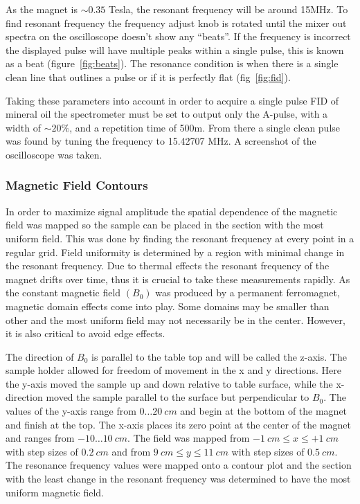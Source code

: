 \documentclass[
reprint,
amsmath,amssymb,
aps,
tikz,
border=5pt
]{revtex4-1}
\begin{document}
    As the magnet is $\sim 0.35$ Tesla, the resonant frequency will be around 15MHz. To find resonant frequency the frequency adjust knob is rotated until the mixer out spectra on the oscilloscope doesn't show any ``beats''. If the frequency is incorrect the displayed pulse will have multiple peaks within a single pulse, this is known as a beat (figure~\ref{fig:beats}). The resonance condition is when there is a single clean line that outlines a pulse or if it is perfectly flat (fig~\ref{fig:fid}). 

    Taking these parameters into account in order to acquire a single pulse FID of mineral oil the spectrometer must be set to output only the A-pulse, with a width of $\sim 20\%$, and a repetition time of 500m. From there a single clean pulse was found by tuning the frequency to 15.42707 MHz. A screenshot of the oscilloscope was taken. 

\subsubsection*{Magnetic Field Contours}

    In order to maximize signal amplitude the spatial dependence of the magnetic field was mapped so the sample can be placed in the section with the most uniform field. This was done by finding the resonant frequency at every point in a regular grid. Field uniformity is determined by a region with minimal change in the resonant frequency. Due to thermal effects the resonant frequency of the magnet drifts over time, thus  it is crucial to take these measurements rapidly. As the constant magnetic field $(B_0)$ was produced by a permanent ferromagnet, magnetic domain effects come into play. Some domains may be smaller than other and the most uniform field may not necessarily be in the center. However, it is also critical to avoid edge effects. 
    
    The direction of $B_0$ is parallel to the table top and will be called the z-axis. The sample holder allowed for freedom of movement in the x and y directions. Here the y-axis moved the sample up and down relative to table surface, while the x-direction moved the sample parallel to the surface but perpendicular to $B_0$. The values of the y-axis range from $0\ldots20~cm$ and begin at the bottom of the magnet and finish at the top. The x-axis places its zero point at the center of the magnet and ranges from $-10\ldots10~cm$. The field was mapped from $-1~cm \leq x \leq +1~cm$ with step sizes of $0.2~cm$ and from $9~cm \leq y \leq 11~cm$ with step sizes of $0.5~cm$. The resonance frequency values were mapped onto a contour plot and the section with the least change  in the resonant frequency was determined to have the most uniform magnetic field. 
\end{document}
